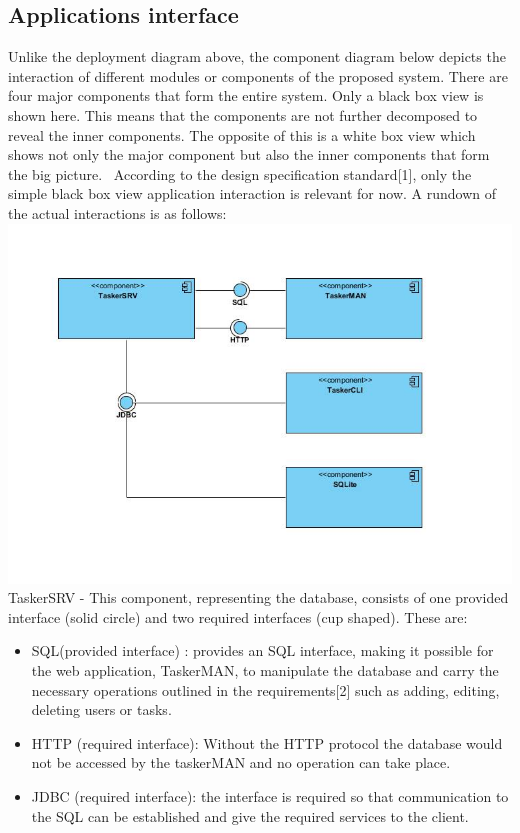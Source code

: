 \documentclass{project}
\begin{document}
\subsection{Applications interface}
Unlike the deployment diagram above, the component diagram below depicts the interaction of different modules or components of the proposed system. There are four major components that form the entire system. Only a black box view is shown here. This means that the components are not further decomposed to reveal the inner components. The opposite of this is a white box view which shows not only the major component but also the inner components that form the big picture.  
According to the design specification standard[1], only the simple black box view application interaction is relevant for now. A rundown of the actual interactions is as follows: \\
\includegraphics[width=\textwidth]{images/4.2/ApplicationsInterface} 
TaskerSRV - This component, representing the database, consists of one provided interface (solid circle) and two required interfaces (cup shaped). These are:
\begin{itemize}
	\item SQL(provided interface) : provides an SQL interface, making it possible for the web application, TaskerMAN, to manipulate the database and carry the necessary operations outlined in the requirements[2] such as adding, editing, deleting users or tasks. 
	\item HTTP (required interface): Without the HTTP protocol the database would not be accessed by the taskerMAN and no operation can take place.
	\item JDBC (required interface): the interface is required so that communication to the SQL can be established and give the required services to the client.
\end{itemize}
\end{document}

